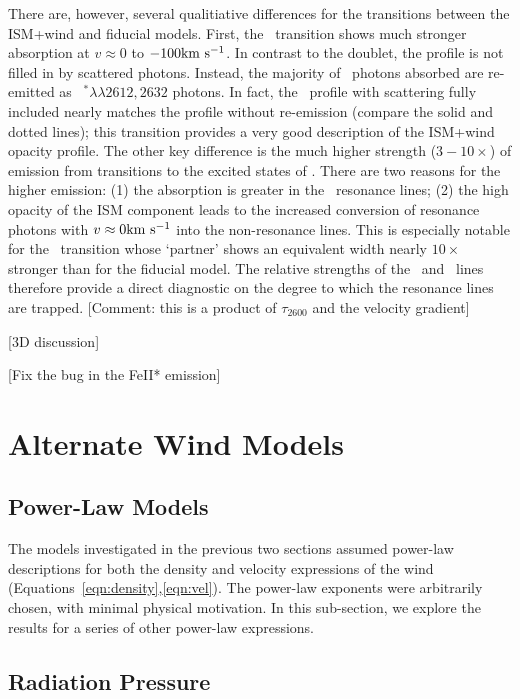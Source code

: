 \documentclass[12pt,preprint]{aastex}
\begin{document}
There are, however, several qualitiative differences 
for the  transitions between the ISM+wind and fiducial
models.
First,
the \feiia\ transition shows much stronger absorption at $v \approx 0$
to $-100 {\rm km~s^{-1}}$.  In contrast to the  doublet,
the profile is not filled in by scattered photons. Instead, 
the majority of \feiia\ photons absorbed are re-emitted as
~$^* \lambda\lambda 2612, 2632$ photons.  In fact, the
\feiia\ profile with scattering fully included nearly matches the profile without re-emission
(compare the solid and dotted lines); this transition provides a
very good description of the ISM+wind opacity profile.  The other key
difference is the much higher strength ($3-10\times$) of emission from
transitions to the excited states of \aconfig.   There are two reasons
for the higher emission: (1) the absorption is greater in the \feiid\
resonance lines; (2) the high opacity of the ISM component leads to
the increased conversion of resonance photons with $v \approx 0{\rm km~s^{-1}}$
into the non-resonance lines.  This is especially notable for the
\feiib\ transition whose `partner' shows an equivalent width nearly
$10\times$ stronger than for the fiducial model.  The relative
strengths of the \feiib\ and \feiie\ lines therefore provide a direct
diagnostic on the degree to which the resonance lines are trapped.
[Comment:  this is a product of $\tau_{2600}$ and the velocity
gradient]

[3D discussion]

[Fix the bug in the FeII* emission]

\section{Alternate Wind Models}

\subsection{Power-Law Models}
\label{sec:power}

The models investigated in the previous two sections
assumed power-law descriptions for both the density and velocity
expressions of the wind (Equations~\ref{eqn:density},\ref{eqn:vel}).
The power-law exponents were arbitrarily chosen, with minimal physical
motivation.  In this sub-section, we explore the results for a series
of other power-law expressions.

\subsection{Radiation Pressure}
\end{document}

